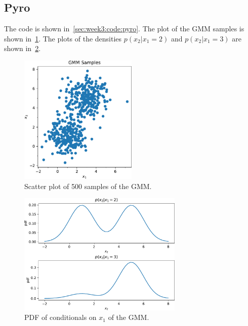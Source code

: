 \subsection{Pyro}

The code is shown in~\cref{sec:week3:code:pyro}.
The plot of the GMM samples is shown in~\cref{fig:week3:pyro:gmm-samples}.
The plots of the densities $p(x_2 | x_1 = 2)$ and $p(x_2 | x_1 = 3)$
are shown in~\cref{fig:week3:pyro:cond-pdf}.

\begin{figure}[htbp]
  \centering
  \includegraphics[width=0.5\textwidth]{./figures/gmm_samples.pdf}
  \caption{Scatter plot of 500 samples of the GMM.}
  \label{fig:week3:pyro:gmm-samples}
\end{figure}

\begin{figure}[htbp]
  \centering
  \includegraphics[width=0.7\textwidth]{./figures/cond_pdf.pdf}
  \caption{
    PDF of conditionals on $x_1$ of the GMM.
  }
  \label{fig:week3:pyro:cond-pdf}
\end{figure}

